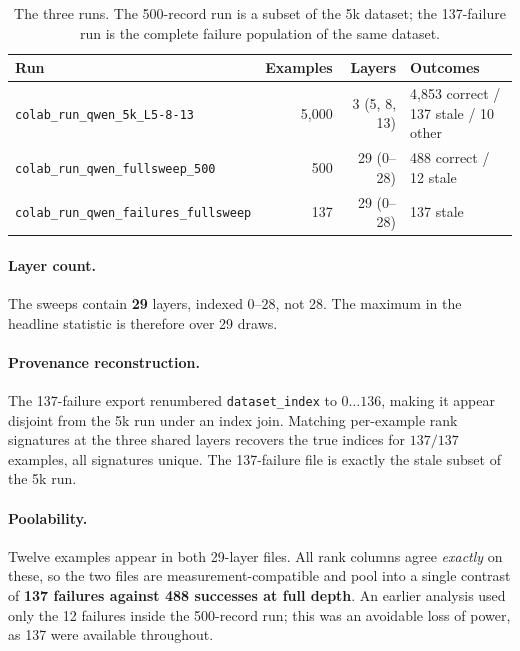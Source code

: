 \documentclass[11pt]{article}
\newcommand{\code}[1]{\texttt{\small #1}}
\begin{document}
\begin{table}[h]
\centering\small
\begin{tabular}{lrrl}
\toprule
Run & Examples & Layers & Outcomes \\
\midrule
\code{colab\_run\_qwen\_5k\_L5-8-13}         & 5{,}000 & 3 (5, 8, 13) & 4{,}853 correct / 137 stale / 10 other \\
\code{colab\_run\_qwen\_fullsweep\_500}      & 500     & 29 (0--28)   & 488 correct / 12 stale \\
\code{colab\_run\_qwen\_failures\_fullsweep} & 137     & 29 (0--28)   & 137 stale \\
\bottomrule
\end{tabular}
\caption{The three runs. The 500-record run is a subset of the 5k dataset; the 137-failure
run is the complete failure population of the same dataset.}
\end{table}

\paragraph{Layer count.} The sweeps contain \textbf{29} layers, indexed $0$--$28$, not 28.
The maximum in the headline statistic is therefore over 29 draws.

\paragraph{Provenance reconstruction.} The 137-failure export renumbered
\code{dataset\_index} to $0\ldots136$, making it appear disjoint from the 5k run under an
index join. Matching per-example rank signatures at the three shared layers recovers the
true indices for $137/137$ examples, all signatures unique. The 137-failure file is exactly
the stale subset of the 5k run.

\paragraph{Poolability.} Twelve examples appear in both 29-layer files. All rank columns
agree \emph{exactly} on these, so the two files are measurement-compatible and pool into a
single contrast of \textbf{137 failures against 488 successes at full depth}. An earlier
analysis used only the 12 failures inside the 500-record run; this was an avoidable loss of
power, as 137 were available throughout.
\end{document}
